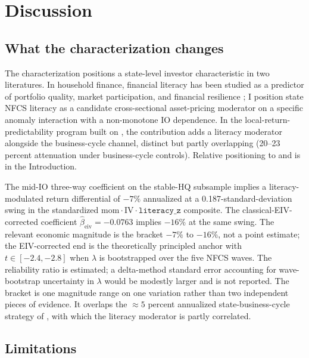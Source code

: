 \section{Discussion}
\label{sec:discussion}

\subsection{What the characterization changes}

The characterization positions a state-level investor characteristic in two literatures. In household finance, financial literacy has been studied as a predictor of portfolio quality, market participation, and financial resilience \citep{lusardiMitchell2014, calvetCampbellSodini2007, grinblattKeloharjuLinnainmaa2012}; I position state NFCS literacy as a candidate cross-sectional asset-pricing moderator on a specific anomaly interaction with a non-monotone IO dependence. In the local-return-predictability program built on \citet{korniotisKumar2013}, the contribution adds a literacy moderator alongside the business-cycle channel, distinct but partly overlapping (20--23 percent attenuation under business-cycle controls). Relative positioning to \citet{hillertJacobsMuller2014} and \citet{korniotisKumarPage2020} is in the Introduction.

The mid-IO three-way coefficient on the stable-HQ subsample implies a literacy-modulated return differential of $-7\%$ annualized at a 0.187-standard-deviation swing in the standardized $\mathrm{mom}\cdot\mathrm{IV}\cdot\mathtt{literacy\_z}$ composite. The classical-EIV-corrected coefficient $\hat\beta_{\text{eiv}} = -0.0763$ implies $-16\%$ at the same swing. The relevant economic magnitude is the bracket $-7\%$ to $-16\%$, not a point estimate; the EIV-corrected end is the theoretically principled anchor with $t \in [-2.4, -2.8]$ when $\lambda$ is bootstrapped over the five NFCS waves. The reliability ratio is estimated; a delta-method standard error accounting for wave-bootstrap uncertainty in $\lambda$ would be modestly larger and is not reported. The bracket is one magnitude range on one variation rather than two independent pieces of evidence. It overlaps the $\approx 5$ percent annualized state-business-cycle strategy of \citet{korniotisKumar2013}, with which the literacy moderator is partly correlated.

\subsection{Limitations}

